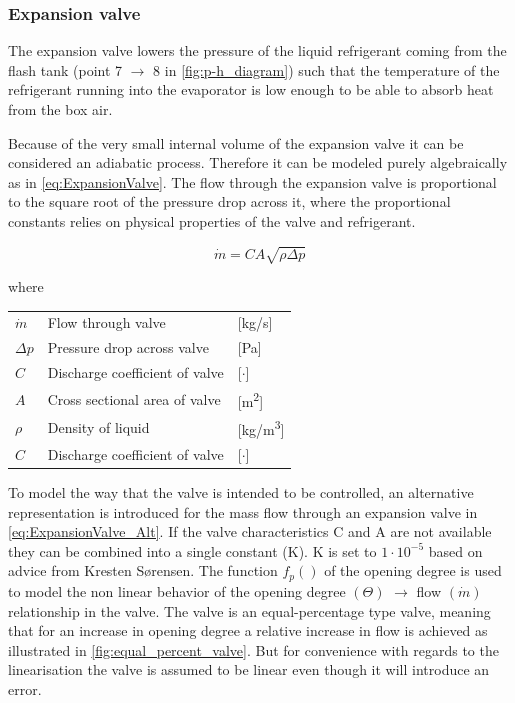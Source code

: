 \subsubsection{Expansion valve}\label{sec:componentModel_Val}
The expansion valve lowers the pressure of the liquid refrigerant coming from the flash tank (point 7 $\rightarrow$ 8 in \cref{fig:p-h_diagram}) such that the temperature of the refrigerant running into the evaporator is low enough to be able to absorb heat from the box air.

Because of the very small internal volume of the expansion valve it can be considered an adiabatic process. Therefore it can be modeled purely algebraically as in \cref{eq:ExpansionValve}. The flow through the expansion valve is proportional to the square root of the pressure drop across it, where the proportional constants relies on physical properties of the valve and refrigerant.

\begin{equation} \label{eq:ExpansionValve}
	\dot{m}= C A \sqrt{\rho\Delta p}
\end{equation}

where
\begin{center}
	\begin{tabular}{l p{8cm} l}
		$\dot{m}$ 	& Flow through valve & [\si{kg}/\si{s}]\\
		$\Delta p$ 	& Pressure drop across valve & [\si{Pa}]\\
		$C$ 		& Discharge coefficient of valve & [$\cdot$]\\
		$A$	 		& Cross sectional area of valve & [\si{m^2}]\\
		$\rho$ 		& Density of liquid & [\si{kg}/\si{m^3}]\\
			$C$ 	& Discharge coefficient of valve & [$\cdot$]\\
	\end{tabular}
\end{center}

To model the way that the valve is intended to be controlled, an alternative representation is introduced for the mass flow through an expansion valve in \cref{eq:ExpansionValve_Alt}. If the valve characteristics C and A are not available they can be combined into a single constant (K). K is set to $1 \cdot 10^{-5}$ based on advice from Kresten Sørensen. The function $f_p()$ of the opening degree is used to model the non linear behavior of the opening degree $( \Theta )$ $\rightarrow$ flow $( \dot{m} )$ relationship in the valve. The valve is an equal-percentage type valve, meaning that for an increase in opening degree a relative increase in flow is achieved as illustrated in \cref{fig:equal_percent_valve}. But for convenience with regards to the linearisation the valve is assumed to be linear even though it will introduce an error.


